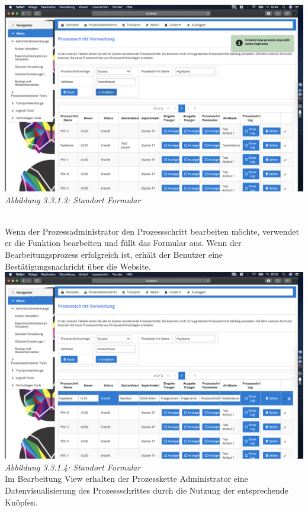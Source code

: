 \documentclass[enabledeprecatedfontcommands,fontsize=12pt,paper=a4,twoside]{scrartcl}
\begin{document}
\hypertarget{sc3.3.1.3}{
\includegraphics[width=1\textwidth]{Screenshots/33creationMeldung.png}
\textit{Abbildung 3.3.1.3: Standort Formular}
} \\
Wenn der Prozessadministrator den Prozessschritt bearbeiten möchte, verwendet er die Funktion bearbeiten und füllt das Formular aus.
Wenn der Bearbeitungsprozess erfolgreich ist, erhält der Benutzer eine Bestätigungsnachricht über die Website.\\
\hypertarget{sc3.3.1.4}{
\includegraphics[width=1\textwidth]{Screenshots/33editView.png}
\textit{Abbildung 3.3.1.4: Standort Formular}
} \\
Im Bearbeitung View erhalten der Prozesskette Administrator eine Datenvisualisierung des Prozessschrittes durch die Nutzung der entsprechende Knöpfen. \\
\end{document}
